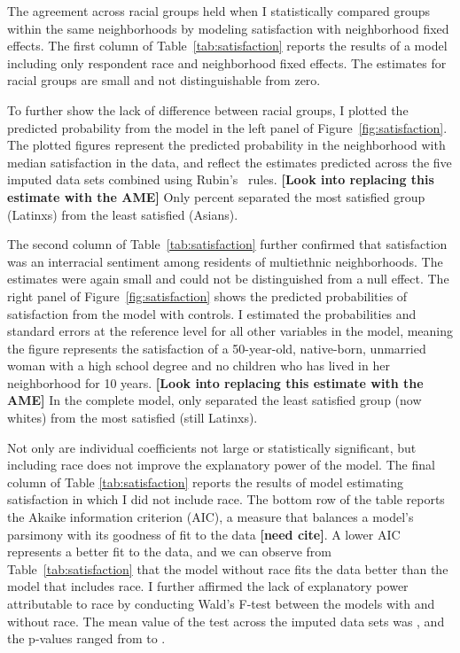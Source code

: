 \documentclass{baderart}
\begin{document}
The agreement across racial groups held when I statistically compared groups within the same neighborhoods by modeling satisfaction with neighborhood fixed effects. The first column of Table~\ref{tab:satisfaction} reports the results of a model including only respondent race and neighborhood fixed effects. The estimates for racial groups are small and not distinguishable from zero.



To further show the lack of difference between racial groups, I plotted the predicted probability from the model in the left panel of Figure~\ref{fig:satisfaction}. The plotted figures represent the predicted probability in the neighborhood with median satisfaction in the data, and reflect the estimates predicted across the five imputed data sets combined using Rubin's~\citep{rubin_multiple_2004} rules. \textbf{{[}Look into replacing this estimate with the AME{]}} Only \maxdiffone percent separated the most satisfied group (Latinxs) from the least satisfied (Asians).


The second column of Table~\ref{tab:satisfaction} further confirmed that satisfaction was an interracial sentiment among residents of multiethnic neighborhoods. The estimates were again small and could not be distinguished from a null effect. The right panel of Figure~\ref{fig:satisfaction} shows the predicted probabilities of satisfaction from the model with controls. I estimated the probabilities and standard errors at the reference level for all other variables in the model, meaning the figure represents the satisfaction of a 50-year-old, native-born, unmarried woman with a high school degree and no children who has lived in her neighborhood for 10 years. \textbf{{[}Look into replacing this estimate with the AME{]}} In the complete model, only \maxdiffthree separated the least satisfied group (now whites) from the most satisfied (still Latinxs).

Not only are individual coefficients not large or statistically significant, but including race does not improve the explanatory power of the model. The final column of Table \ref{tab:satisfaction} reports the results of model estimating satisfaction in which I did not include race. The bottom row of the table reports the Akaike information criterion (AIC), a measure that balances a model's parsimony with its goodness of fit to the data \textbf{{[}need cite{]}}. A lower AIC represents a better fit to the data, and we can observe from Table~\ref{tab:satisfaction} that the model without race fits the data better than the model that includes race. I further affirmed the lack of explanatory power attributable to race by conducting Wald's F-test between the models with and without race. The mean value of the test across the imputed data sets was \satWaldF, and the p-values ranged from \satWaldpMin to \satWaldpMax.
\end{document}
